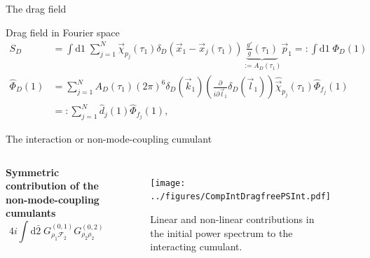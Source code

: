 \documentclass[10pt]{beamer}
\begin{document}
\begin{frame}{The drag field}
	\begin{block}{Drag field in Fourier space}
		\begin{align*}
		S_D &= \int \textrm{d}1 \; \sum_{j=1}^{N} \vec{\chi}_{p_j}(\tau_1) \delta_D(\vec{x}_1 - \vec{x}_j (\tau_1)) \underbrace{\frac{g'}{g}(\tau_1)}_{:= A_D (\tau_1)} \vec{p}_1 =: \int \textrm{d}1 \; \Phi_D (1)\\
		\hat{\Phi}_D (1)& = \sum_{j=1}^{N}  A_D (\tau_1) (2\pi)^6 \delta_D(\vec{k}_1) \left(\frac{\partial}{i \partial \vec{l}_1} \delta_D(\vec{l}_1)\right) \hat{\vec{\chi}}_{p_j} (\tau_1)\hat{ \Phi}_{f_j}(1) \\
		&=: \sum_{j=1}^{N} \hat{ d} _j (1) \hat{ \Phi}_{f_j}(1), 
		\end{align*}
	\end{block}
\end{frame}
\begin{frame}{The interaction or non-mode-coupling cumulant}
		\begin{columns}
		\textbf{Symmetric contribution of the non-mode-coupling cumulants}
			\begin{equation*}
					    	4 i \int \textrm{d}\bar{2} \; G^{(0,1)}_{\rho_{\bar{1}} \mathcal{F}_{\bar{2}}} G^{(0,2)}_{\rho_{\bar{2}} \rho_2}  
			\end{equation*}
					\begin{figure}
					\texttt{[image: ../figures/CompIntDragfreePSInt.pdf]}
						\caption{ Linear and non-linear contributions in the initial power spectrum to the interacting cumulant.}
					
				     \end{figure}

			\end{columns}
\end{frame}
\end{document}
